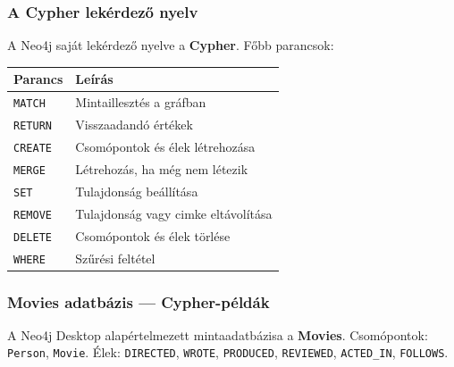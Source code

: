 \documentclass[
  magyar,
]{article}
\begin{document}
\subsubsection{A Cypher lekérdező
nyelv}\label{a-cypher-lekuxe9rdezux151-nyelv}

A Neo4j saját lekérdező nyelve a \textbf{Cypher}. Főbb parancsok:

\begin{longtable}[]{@{}ll@{}}
\toprule\noalign{}
Parancs & Leírás \\
\midrule\noalign{}
\endhead
\bottomrule\noalign{}
\endlastfoot
\texttt{MATCH} & Mintaillesztés a gráfban \\
\texttt{RETURN} & Visszaadandó értékek \\
\texttt{CREATE} & Csomópontok és élek létrehozása \\
\texttt{MERGE} & Létrehozás, ha még nem létezik \\
\texttt{SET} & Tulajdonság beállítása \\
\texttt{REMOVE} & Tulajdonság vagy cimke eltávolítása \\
\texttt{DELETE} & Csomópontok és élek törlése \\
\texttt{WHERE} & Szűrési feltétel \\
\end{longtable}

\subsubsection{Movies adatbázis ---
Cypher-példák}\label{movies-adatbuxe1zis-cypher-puxe9lduxe1k}

A Neo4j Desktop alapértelmezett mintaadatbázisa a \textbf{Movies}.
Csomópontok: \texttt{Person}, \texttt{Movie}. Élek: \texttt{DIRECTED},
\texttt{WROTE}, \texttt{PRODUCED}, \texttt{REVIEWED},
\texttt{ACTED\_IN}, \texttt{FOLLOWS}.
\end{document}
